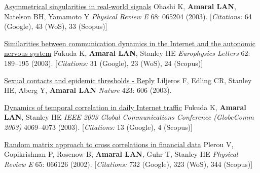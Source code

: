\NumberedItem{\makebox[0.8cm][r]{[50]}}
\href{/people/amaral/asymmetrical-singularities-in-real-world-signals}
{Asymmetrical singularities in real-world signals}
\newline
Ohashi K, {\textbf{Amaral LAN}}, Natelson BH, Yamamoto Y
\newline
\textit{Physical Review E}
    68:
065204 (2003).
    [{\em{Citations:}} 64 (Google), 43 (WoS), 33 (Scopus)]
\newline
\Gap
~
\Gap

\NumberedItem{\makebox[0.8cm][r]{[49]}}
\href{/people/amaral/similarities-between-communication-dynamics-in-the-internet-and-the-autonomic-nervous-system}
{Similarities between communication dynamics in the Internet and the autonomic nervous system}
\newline
Fukuda K, {\textbf{Amaral LAN}}, Stanley HE
\newline
\textit{Europhysics Letters}
    62:
189--195 (2003).
    [{\em{Citations:}} 31 (Google), 23 (WoS), 24 (Scopus)]
\newline
\Gap
~
\Gap

\NumberedItem{\makebox[0.8cm][r]{[48]}}
\href{/people/amaral/sexual-contacts-and-epidemic-thresholds-reply}
{Sexual contacts and epidemic thresholds - Reply}
\newline
Liljeros F, Edling CR, Stanley HE, Aberg Y, {\textbf{Amaral LAN}}
\newline
\textit{Nature}
    423:
606 (2003).
\newline
\Gap
~
\Gap

\NumberedItem{\makebox[0.8cm][r]{[47]}}
\href{/people/amaral/dynamics-of-temporal-correlation-in-daily-internet-traffic}
{Dynamics of temporal correlation in daily Internet traffic}
\newline
Fukuda K, {\textbf{Amaral LAN}}, Stanley HE
\newline
\textit{IEEE 2003 Global Communications Conference (GlobeComm 2003)}
4069--4073 (2003).
    [{\em{Citations:}} 13 (Google), 4 (Scopus)]
\newline
\Gap
~
\Gap

\NumberedItem{\makebox[0.8cm][r]{[46]}}
\href{/people/amaral/random-matrix-approach-to-cross-correlations-in-financial-data}
{Random matrix approach to cross correlations in financial data}
\newline
Plerou V, Gopikrishnan P, Rosenow B, {\textbf{Amaral LAN}}, Guhr T, Stanley HE
\newline
\textit{Physical Review E}
    65:
066126 (2002).
    [{\em{Citations:}} 732 (Google), 323 (WoS), 344 (Scopus)]
\newline
\Gap
~
\Gap

